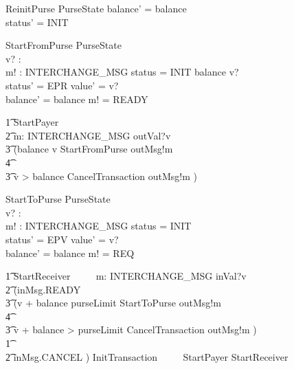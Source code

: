 \documentclass{article}
\begin{document}
\begin{schema}{ReinitPurse}
     \Delta PurseState
\where
      balance' = balance \\
      status' = INIT
\end{schema}

\begin{schema}{StartFromPurse}
     \Delta PurseState \\
     v? : \nat \\
     m! : INTERCHANGE\_MSG
\where
      status = INIT \land balance \geq v? \\
      status' = EPR \land value' = v? \\
      balance' = balance \land m! = READY
\end{schema}

\begin{circusaction}
    \t1 StartPayer ~~\circdef~~ \\
    		\t2 \circvar m: INTERCHANGE\_MSG \circspot outVal?v \then \\
			\t3 (\lcircguard balance \geq v \rcircguard \circguard \lschexpract StartFromPurse \rschexpract \circseq outMsg!m \then \Skip \\
				\t4 \extchoice \\
			\t3 \lcircguard v > balance \rcircguard \circguard \lschexpract CancelTransaction \rschexpract \circseq outMsg!m \then \Skip)
\end{circusaction}

\begin{schema}{StartToPurse}
     \Delta PurseState \\
     v? : \nat \\
     m! : INTERCHANGE\_MSG
\where
      status = INIT\\
      status' = EPV \land value' = v? \\
      balance' = balance \land m! = REQ
\end{schema}

\begin{circusaction}
    \t1 StartReceiver ~~\circdef~~  \circvar m: INTERCHANGE\_MSG \circspot inVal?v \then \\
		\t2 (inMsg.READY \then \\
			\t3 (\lcircguard v + balance \leq purseLimit \rcircguard \circguard \lschexpract StartToPurse \rschexpract \circseq outMsg!m \then \Skip \\
				\t4 \extchoice \\
			\t3 \lcircguard v + balance > purseLimit \rcircguard \circguard \lschexpract CancelTransaction \rschexpract \circseq outMsg!m \then \Skip) \\
		\t1 \extchoice \\
		\t2 inMsg.CANCEL \then \Skip)
	\also
	InitTransaction ~~\circdef~~ StartPayer \extchoice StartReceiver
\end{circusaction}
\end{document}
